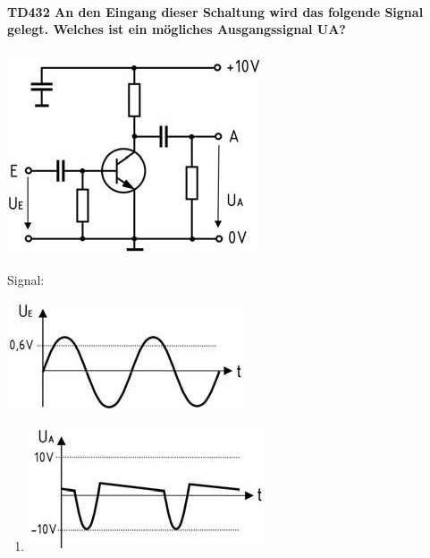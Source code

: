 \documentclass[8pt]{article}
\begin{document}
\begin{enumerate}
\begin{enumerate}[nolistsep,label=\Alph*]
\paragraph*{TD432 An den Eingang dieser Schaltung wird das folgende Signal gelegt. Welches ist ein mögliches Ausgangssignal UA?}
\begin{center}
	\begin{minipage}{\linewidth}
		\centering
		\includegraphics[scale=1.0]{pics/td432_a.jpg}
	\end{minipage}
\end{center}
Signal:
\begin{center}
	\begin{minipage}{\linewidth}
		\centering
		\includegraphics[scale=1.0]{pics/td432_b.jpg}
	\end{minipage}
\end{center}
\begin{enumerate}[nolistsep,label=\Alph*]
\item
\begin{center}
	\begin{minipage}{\linewidth}
		\centering
		\includegraphics[scale=1.0]{pics/td432_c.jpg}
	\end{minipage}
\end{center}

\end{enumerate}
\end{enumerate}
\end{enumerate}
\end{document}
